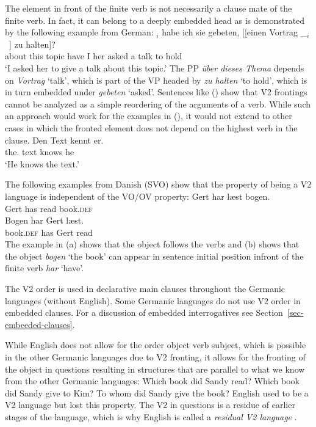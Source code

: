 The element in front of the finite verb is not necessarily a clause mate of the finite verb. In
fact, it can belong to a deeply embedded head as is demonstrated by the following example from
German:
\ea
{}$_i$ habe ich sie gebeten, [[einen Vortrag \_$_i$~] zu halten]?\footnotemark\\
     \spacebr{}about this topic  have I her asked \hphantom{[[}a talk {} to hold\\\german
{}
\glt `I asked her to give a talk about this topic.'
\z
The PP \emph{über dieses Thema} depends on \emph{Vortrag} `talk', which is part of the VP headed by
\emph{zu halten} `to hold', which is in turn embedded under \emph{gebeten} `asked'. Sentences like
() show that V2 frontings cannot be analyzed as a simple reordering of the arguments of a
verb. While such an approach would work for the examples in (), it would not extend to other
cases in which the fronted element does not depend on the highest verb in the clause.
\ea
\gll Den Text kennt er.\\
     the.\ACC{} text knows he\\
\glt `He knows the text.'
\z

The following examples from Danish (SVO) show that the property of being a V2
language is independent of the VO/OV property:
\eal
\ex 
\gll Gert har læst bogen.\\
     Gert has read book.\textsc{def}\\\danish
\ex
\gll Bogen har Gert læst.\\
     book.\textsc{def} has Gert read\\
\zl
The example in (a) shows that the object follows the verbs and (b) shows that the
object \emph{bogen} `the book' can appear in sentence initial position infront of the finite verb
\emph{har} `have'.

The V2 order is used in declarative main clauses throughout the Germanic languages (without
English). Some Germanic languages do not use V2 order in embedded clauses. For a discussion of
embedded interrogatives see Section~\ref{sec-embeeded-clauses}.

While English does not allow for the order object verb subject, which is possible in the other Germanic
languages due to V2 fronting, it allows for the fronting of the object in questions resulting in
structures that are parallel to what we know from the other Germanic languages:
\eal
\ex Which book did Sandy read?
\ex Which book did Sandy give to Kim?
\ex To whom did Sandy give the book?
\zl
English used to be a V2 language but lost this property. The V2 in questions is a residue of earlier
stages of the language, which is why English is called a \emph{residual V2 language} \citep[]{Rizzi1990a-u}. 

